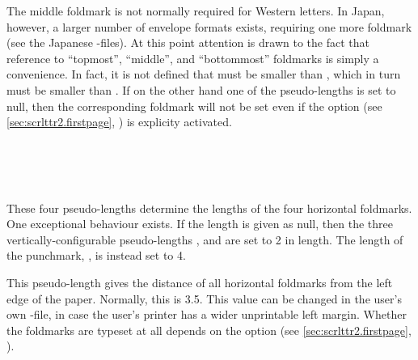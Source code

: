 The middle foldmark is not normally required for Western letters. In Japan,
however, a larger number of envelope formats exists, requiring one more
foldmark (see the Japanese -files). At this point attention is drawn
to the fact that reference to ``topmost'', ``middle'', and ``bottommost''
foldmarks is simply a convenience. In fact, it is not defined that
 must be smaller than , which in
turn must be smaller than . If on the other hand one of
the pseudo-lengths is set to null, then the corresponding foldmark will not be
set even if the option
%
 (see \autoref{sec:scrlttr2.firstpage},
) is explicity activated.
%
%
%
%


\begin{Declaration}
  \\
  \\
  \\
\end{Declaration}
%
%
%
%
These four pseudo-lengths determine the
lengths of the four horizontal foldmarks. One
exceptional behaviour exists. If the length is given as null, then the three
vertically-configurable pseudo-lengths ,
 and  are set to 2
in length. The length of the punchmark, , is instead
set to 4.%
%
%
%
%


\begin{Declaration}
\end{Declaration}
%
This pseudo-length gives the distance of all horizontal foldmarks from the
left edge of the paper. Normally, this is 3.5. This
value can be changed in the user's own -file, in case the user's
printer has a wider unprintable left margin. Whether the foldmarks are typeset
at all depends on the option %
 (see
\autoref{sec:scrlttr2.firstpage},
).
%
%



